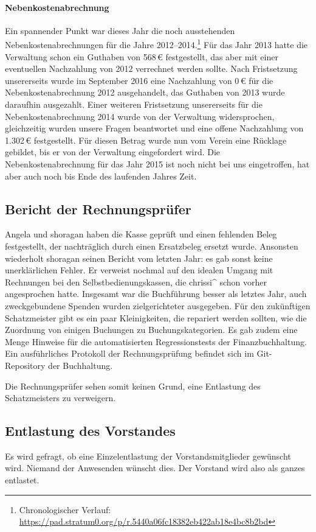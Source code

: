 \documentclass{s0minutes}
\begin{document}
\paragraph{Nebenkostenabrechnung} Ein spannender Punkt war dieses Jahr die noch
ausstehenden Nebenkostenabrechnungen für die Jahre
2012--2014.\footnote{Chronologischer Verlauf:
\url{https://pad.stratum0.org/p/r.5440a06fc18382eb422ab18e4bc8b2bd}} Für das
Jahr 2013 hatte die Verwaltung schon ein Guthaben von 568\,€ festgestellt, das
aber mit einer eventuellen Nachzahlung von 2012 verrechnet werden sollte. Nach
Fristsetzung unsererseits wurde im September 2016 eine Nachzahlung von 0\,€ für
die Nebenkostenabrechnung 2012 ausgehandelt, das Guthaben von 2013 wurde
daraufhin ausgezahlt. Einer weiteren Fristsetzung unsererseits für die
Nebenkostenabrechnung 2014 wurde von der Verwaltung widersprochen, gleichzeitig
wurden unsere Fragen beantwortet und eine offene Nachzahlung von 1{.}302\,€
festgestellt. Für diesen Betrag wurde nun vom Verein eine Rücklage gebildet, bis
er von der Verwaltung eingefordert wird. Die Nebenkostenabrechnung für das Jahr
2015 ist noch nicht bei uns eingetroffen, hat aber auch noch bis Ende des
laufenden Jahres Zeit.

\subsection{Bericht der Rechnungsprüfer}
Angela und shoragan haben die Kasse geprüft und einen fehlenden Beleg
festgestellt, der nachträglich durch einen Ersatzbeleg ersetzt wurde.
Ansonsten wiederholt shoragan seinen Bericht vom letzten Jahr: es gab sonst
keine unerklärlichen Fehler. Er verweist nochmal auf den idealen Umgang mit
Rechnungen bei den Selbstbedienungskassen, die chrissi\^{} schon vorher
angesprochen hatte. Insgesamt war die Buchführung besser als letztes Jahr, auch
zweckgebundene Spenden wurden zielgerichteter ausgegeben. Für den zukünftigen
Schatzmeister gibt es ein paar Kleinigkeiten, die repariert werden sollten, wie
die Zuordnung von einigen Buchungen zu Buchungskategorien. Es gab zudem eine
Menge Hinweise für die automatisierten Regressionstests der Finanzbuchhaltung.
Ein ausführliches Protokoll der Rechnungsprüfung befindet sich im Git-Repository
der Buchhaltung.

Die Rechnungsprüfer sehen somit keinen Grund, eine Entlastung des Schatzmeisters
zu verweigern.

\subsection{Entlastung des Vorstandes}
Es wird gefragt, ob eine Einzelentlastung der Vorstandsmitglieder gewünscht
wird. Niemand der Anwesenden wünscht dies. Der Vorstand wird also als ganzes
entlastet.
\end{document}

